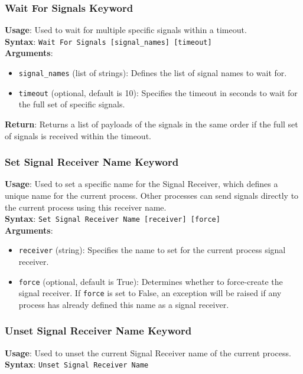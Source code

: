 \subsubsection{Wait For Signals Keyword}
\textbf{Usage}: Used to wait for multiple specific signals within a timeout. \\
\textbf{Syntax}: \texttt{Wait For Signals [signal\_names] [timeout]} \\
\textbf{Arguments}:
\begin{itemize}
    \item \texttt{signal\_names} (list of strings): Defines the list of signal names to wait for.
    \item \texttt{timeout} (optional, default is 10): Specifies the timeout in seconds to wait for the full set of specific signals.
\end{itemize}
\textbf{Return}: Returns a list of payloads of the signals in the same order if the full set of signals is received within the timeout.

\subsubsection{Set Signal Receiver Name Keyword}
\textbf{Usage}: Used to set a specific name for the Signal Receiver, which defines a unique name for the current process. Other processes can send signals directly to the current process using this receiver name. \\
\textbf{Syntax}: \texttt{Set Signal Receiver Name [receiver] [force]} \\
\textbf{Arguments}:
\begin{itemize}
    \item \texttt{receiver} (string): Specifies the name to set for the current process signal receiver.
    \item \texttt{force} (optional, default is True): Determines whether to force-create the signal receiver. If \texttt{force} is set to False, an exception will be raised if any process has already defined this name as a signal receiver.
\end{itemize}

\subsubsection{Unset Signal Receiver Name Keyword}
\textbf{Usage}: Used to unset the current Signal Receiver name of the current process. \\
\textbf{Syntax}: \texttt{Unset Signal Receiver Name}


